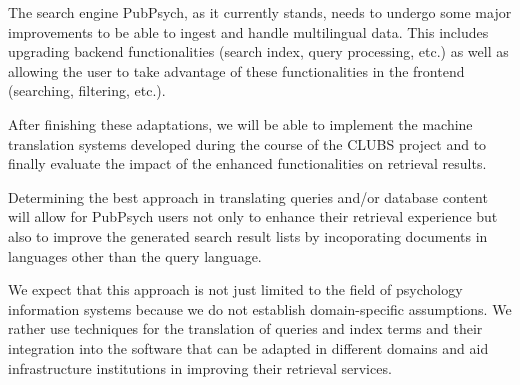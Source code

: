 \documentclass[a4paper,11pt]{article}
\begin{document}
The search engine PubPsych, as it currently stands, needs to undergo some major improvements to be able to ingest and handle multilingual data. This includes upgrading backend functionalities (search index, query processing, etc.) as well as allowing the user to take advantage of these functionalities in the frontend (searching, filtering, etc.).

After finishing these adaptations, we will be able to implement the machine translation systems developed during the course of the CLUBS project and to finally evaluate the impact of the enhanced functionalities on retrieval results.

Determining the best approach in translating queries and/or database content will allow for PubPsych users not only to enhance their retrieval experience but also to improve the generated search result lists by incoporating documents in languages other than the query language.

We expect that this approach is not just limited to the field of psychology information systems because we do not establish domain-specific assumptions. We rather use techniques for the translation of queries and index terms and their integration into the software that can be adapted in different domains and aid infrastructure institutions in improving their retrieval services.



%


%
%
{}


\end{document}
